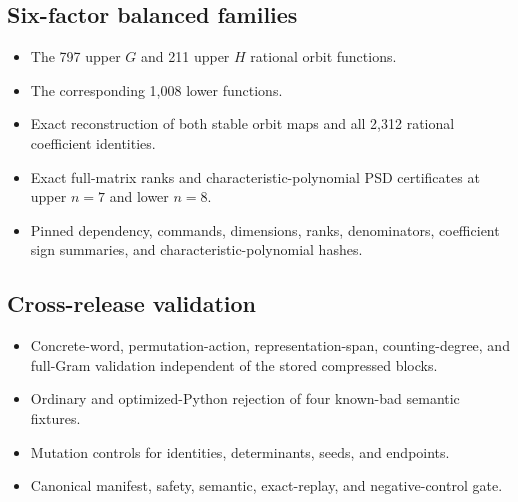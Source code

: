 \documentclass[11pt]{article}
\begin{document}
\subsection*{Six-factor balanced families}
\begin{itemize}
\item {}\par
The 797 upper \(G\) and 211 upper \(H\) rational orbit functions.
\item {}\par
The corresponding 1,008 lower functions.
\item {}\par
Exact reconstruction of both stable orbit maps and all 2,312 rational
coefficient identities.
\item {}\par
Exact full-matrix ranks and characteristic-polynomial PSD certificates at
upper \(n=7\) and lower \(n=8\).
\item {}\par
Pinned dependency, commands, dimensions, ranks, denominators, coefficient
sign summaries, and characteristic-polynomial hashes.
\end{itemize}

\subsection*{Cross-release validation}
\begin{itemize}
\item {}\par
Concrete-word, permutation-action, representation-span, counting-degree, and
full-Gram validation independent of the stored compressed blocks.
\item {}\par
Ordinary and optimized-Python rejection of four known-bad semantic fixtures.
\item {}\par
Mutation controls for identities, determinants, seeds, and endpoints.
\item {}\par
Canonical manifest, safety, semantic, exact-replay, and negative-control gate.
\end{itemize}
\end{document}
